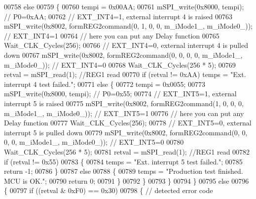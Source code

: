 \begin{DoxyCode}
{{{{{00758         \textcolor{keywordflow}{else}
00759         \{
00760             tempi = 0x00AA;
00761             mSPI\_write(0x8000, tempi); \textcolor{comment}{// P0=0xAA;}
00762             \textcolor{comment}{// EXT\_INT4=1, external interrupt 4 is raised}
00763             mSPI\_write(0x8002, formREG2command(0, 1, 0, 0, m\_iMode1\_, m\_iMode0\_)); \textcolor{comment}{// EXT\_INT4=1}
00764             \textcolor{comment}{// here you can put any Delay function}
00765             Wait\_CLK\_Cycles(256);
00766             \textcolor{comment}{// EXT\_INT4=0, external interrupt 4 is pulled down}
00767             mSPI\_write(0x8002, formREG2command(0, 0, 0, 0, m\_iMode1\_, m\_iMode0\_)); \textcolor{comment}{// EXT\_INT4=0}
00768             Wait\_CLK\_Cycles(256 * 5);
00769             retval = mSPI\_read(1);  \textcolor{comment}{//REG1 read}
00770             \textcolor{keywordflow}{if} (retval != 0xAA)  temps = \textcolor{stringliteral}{"Ext. interrupt 4 test failed."};
00771             \textcolor{keywordflow}{else} \{
00772                 tempi = 0x0055;
00773                 mSPI\_write(0x8000, tempi); \textcolor{comment}{// P0=0x55;}
00774                 \textcolor{comment}{// EXT\_INT5=1, external interrupt 5 is raised}
00775                 mSPI\_write(0x8002, formREG2command(1, 0, 0, 0, m\_iMode1\_, m\_iMode0\_)); \textcolor{comment}{// EXT\_INT5=1}
00776                 \textcolor{comment}{// here you can put any Delay function}
00777                 Wait\_CLK\_Cycles(256);
00778                 \textcolor{comment}{// EXT\_INT5=0, external interrupt 5 is pulled down}
00779                 mSPI\_write(0x8002, formREG2command(0, 0, 0, 0, m\_iMode1\_, m\_iMode0\_)); \textcolor{comment}{// EXT\_INT5=0}
00780                 Wait\_CLK\_Cycles(256 * 5);
00781                 retval = mSPI\_read(1);  \textcolor{comment}{//REG1 read}
00782                 \textcolor{keywordflow}{if} (retval != 0x55)
00783                 \{
00784                     temps = \textcolor{stringliteral}{"Ext. interrupt 5 test failed."};
00785                     \textcolor{keywordflow}{return} -1;
00786                 \}
00787                 \textcolor{keywordflow}{else}
00788                 \{
00789                     temps = \textcolor{stringliteral}{"Production test finished. MCU is OK."};
00790                     \textcolor{keywordflow}{return} 0;
00791                 \}
00792             \}
00793         \}
00794     \}
00795     \textcolor{keywordflow}{else}
00796     \{
00797         \textcolor{keywordflow}{if} ((retval & 0xF0) == 0x30)
00798         \{ \textcolor{comment}{// detected error code}
}}}}}
\end{DoxyCode}
